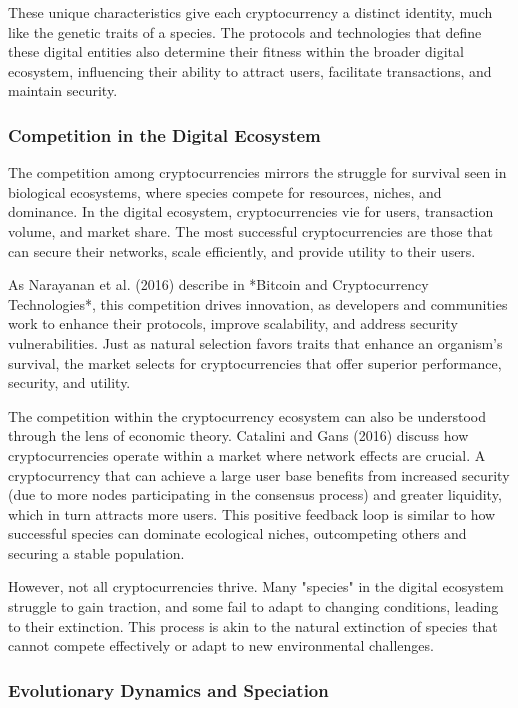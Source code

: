 \documentclass[12pt,twoside]{article}
\begin{document}
These unique characteristics give each cryptocurrency a distinct identity, much like the genetic traits of a species. The protocols and technologies that define these digital entities also determine their fitness within the broader digital ecosystem, influencing their ability to attract users, facilitate transactions, and maintain security.

\subsubsection{Competition in the Digital Ecosystem}

The competition among cryptocurrencies mirrors the struggle for survival seen in biological ecosystems, where species compete for resources, niches, and dominance. In the digital ecosystem, cryptocurrencies vie for users, transaction volume, and market share. The most successful cryptocurrencies are those that can secure their networks, scale efficiently, and provide utility to their users.

As Narayanan et al. (2016) describe in *Bitcoin and Cryptocurrency Technologies*, this competition drives innovation, as developers and communities work to enhance their protocols, improve scalability, and address security vulnerabilities. Just as natural selection favors traits that enhance an organism's survival, the market selects for cryptocurrencies that offer superior performance, security, and utility.

The competition within the cryptocurrency ecosystem can also be understood through the lens of economic theory. Catalini and Gans (2016) discuss how cryptocurrencies operate within a market where network effects are crucial. A cryptocurrency that can achieve a large user base benefits from increased security (due to more nodes participating in the consensus process) and greater liquidity, which in turn attracts more users. This positive feedback loop is similar to how successful species can dominate ecological niches, outcompeting others and securing a stable population.

However, not all cryptocurrencies thrive. Many "species" in the digital ecosystem struggle to gain traction, and some fail to adapt to changing conditions, leading to their extinction. This process is akin to the natural extinction of species that cannot compete effectively or adapt to new environmental challenges.

\subsubsection{Evolutionary Dynamics and Speciation}
\end{document}
